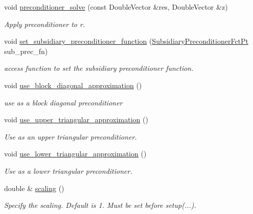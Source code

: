 \begin{DoxyCompactItemize}
void \hyperlink{classoomph_1_1PseudoElasticPreconditionerSubsidiaryBlockPreconditionerOld_a31f3b927696c11c90f704178cae13e7e}{preconditioner\+\_\+solve} (const Double\+Vector \&res, Double\+Vector \&z)
\begin{DoxyCompactList}\small\item\em Apply preconditioner to r. \end{DoxyCompactList}\item 
void \hyperlink{classoomph_1_1PseudoElasticPreconditionerSubsidiaryBlockPreconditionerOld_a6c238d4e402413fe20061d5735acb40c}{set\+\_\+subsidiary\+\_\+preconditioner\+\_\+function} (\hyperlink{classoomph_1_1PseudoElasticPreconditionerSubsidiaryBlockPreconditionerOld_a85f57923e70244d5fde0538946eb8c3d}{Subsidiary\+Preconditioner\+Fct\+Pt} sub\+\_\+prec\+\_\+fn)
\begin{DoxyCompactList}\small\item\em access function to set the subsidiary preconditioner function. \end{DoxyCompactList}\item 
void \hyperlink{classoomph_1_1PseudoElasticPreconditionerSubsidiaryBlockPreconditionerOld_a1d2c4fa73f0e4839e20ddca2e799da3c}{use\+\_\+block\+\_\+diagonal\+\_\+approximation} ()
\begin{DoxyCompactList}\small\item\em use as a block diagonal preconditioner \end{DoxyCompactList}\item 
void \hyperlink{classoomph_1_1PseudoElasticPreconditionerSubsidiaryBlockPreconditionerOld_a3a6487cc895a4e3a3fe8f978024e116e}{use\+\_\+upper\+\_\+triangular\+\_\+approximation} ()
\begin{DoxyCompactList}\small\item\em Use as an upper triangular preconditioner. \end{DoxyCompactList}\item 
void \hyperlink{classoomph_1_1PseudoElasticPreconditionerSubsidiaryBlockPreconditionerOld_a4ac42f45ed94d02f2fd25b3807653979}{use\+\_\+lower\+\_\+triangular\+\_\+approximation} ()
\begin{DoxyCompactList}\small\item\em Use as a lower triangular preconditioner. \end{DoxyCompactList}\item 
double \& \hyperlink{classoomph_1_1PseudoElasticPreconditionerSubsidiaryBlockPreconditionerOld_ad6cb2301227704660e2f621f9de504cf}{scaling} ()
\begin{DoxyCompactList}\small\item\em Specify the scaling. Default is 1. Must be set before setup(...). \end{DoxyCompactList}\end{DoxyCompactItemize}
